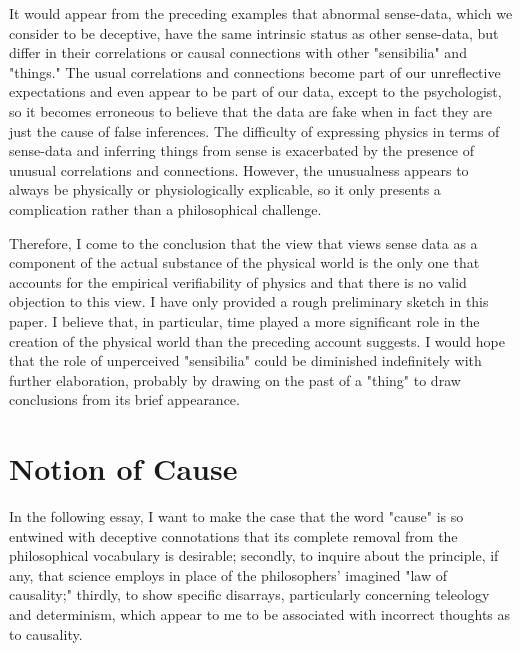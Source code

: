 \documentclass[a4paper,12pt]{book}[2004/02/16]
\theoremstyle{ilemma}
\theoremstyle{itheorem}
\theoremstyle{iother}
\theoremstyle{icorollary}
\theoremstyle{numcorollary}
\theoremstyle{idefinition}
\begin{document}
It would appear from the preceding examples that abnormal sense-data, which we consider to be deceptive, have the same intrinsic status as other sense-data, but differ in their correlations or causal connections with other "sensibilia" and "things." The usual correlations and connections become part of our unreflective expectations and even appear to be part of our data, except to the psychologist, so it becomes erroneous to believe that the data are fake when in fact they are just the cause of false inferences. The difficulty of expressing physics in terms of sense-data and inferring things from sense is exacerbated by the presence of unusual correlations and connections. However, the unusualness appears to always be physically or physiologically explicable, so it only presents a complication rather than a philosophical challenge.

Therefore, I come to the conclusion that the view that views sense data as a component of the actual substance of the physical world is the only one that accounts for the empirical verifiability of physics and that there is no valid objection to this view. I have only provided a rough preliminary sketch in this paper. I believe that, in particular, time played a more significant role in the creation of the physical world than the preceding account suggests. I would hope that the role of unperceived "sensibilia" could be diminished indefinitely with further elaboration, probably by drawing on the past of a "thing" to draw conclusions from its brief appearance.
\chapter{Notion of Cause}
In the following essay, I want to make the case that the word "cause" is so entwined with deceptive connotations that its complete removal from the philosophical vocabulary is desirable; secondly, to inquire about the principle, if any, that science employs in place of the philosophers' imagined "law of causality;" thirdly, to show specific disarrays,
particularly concerning teleology and determinism, which appear to me
to be associated with incorrect thoughts as to causality.
\end{document}
